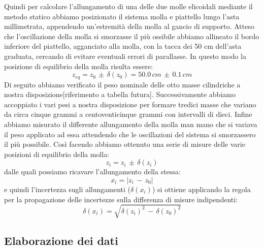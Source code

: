 Quindi per calcolare l'allungamento di una delle due molle elicoidali mediante il metodo statico abbiamo posizionato il sistema molla e piattello lungo l'asta millimetrata, appendendo un'estremità della molla al gancio di supporto. Atteso che l'oscillazione della molla si smorzasse il più ossibile abbiamo allineato il bordo inferiore del piattello, agganciato alla molla, con la tacca dei 50 cm dell'asta graduata, cercando di evitare eventuali errori di parallasse. In questo modo la posizione di equilibrio della molla risulta essere:
\begin{equation}
	z_{eq} = z_0\,\pm\,\delta(z_0) = 50.0\,cm\,\pm\,0.1\,cm
\end{equation}
Di seguito abbiamo verificato il peso nominale delle otto masse cilindriche a nostra disposizione[riferimento a tabella futura]. Successivamente abbiamo accoppiato i vari pesi a nostra disposizione per formare tredici masse che variano da circa cinque grammi a centoventicinque grammi con intervalli di dieci. Infine abbiamo misurato il differente allungamento della molla man mano che  si variava il peso applicato ad essa attendendo che le oscillazioni del sistema si smorzassero il più possibile. Così facendo abbiamo ottenuto una serie di misure delle varie posizioni di equilibrio della molla:
\begin{equation}
	z_i = z_i\,\pm\,\delta(z_i) 
\end{equation}
dalle quali possiamo ricavare l'allungamento della stessa:
\begin{equation}
	x_i = |z_i\,-\,z_0|
\end{equation}
e quindi l’incertezza sugli allungamenti ($\delta(x_i)$) si ottiene applicando la regola per la propagazione delle incertezze sulla differenza di misure indipendenti:
\begin{equation}
	\delta(x_i) = \sqrt{\delta(z_i)^2\,-\,\delta(z_0)^2}
\end{equation}

\subsection{Elaborazione dei dati}

